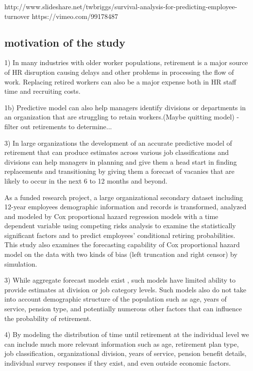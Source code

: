 \documentclass[12pt,letterpaper]{article}
\begin{document}
http://www.slideshare.net/twbriggs/survival-analysis-for-predicting-employee-turnover
https://vimeo.com/99178487


\subsection{motivation of the study}
1) In many industries with older worker populations, retirement is a major source of HR disruption causing delays and other problems in processing the flow of work.  Replacing retired workers can also be a major expense both in HR staff time and recruiting costs.

1b) Predictive model can also help managers identify divisions or departments in an organization that are struggling to retain workers.(Maybe quitting model) - filter out retirements to determine...

3) In large organizations the development of an accurate predictive model of retirement that can produce estimates across various job classifications and divisions can help managers in planning and give them a head start in finding replacements and transitioning by giving them a forecast of vacanies that are likely to occur in the next 6 to 12 months and beyond.



As a funded research project, a large organizational secondary dataset including 12-year employees demographic information and records is transformed, analyzed and modeled by Cox proportional hazard regression models with a time dependent variable using competing risks analysis to examine the statistically significant factors and to predict employees' conditional retiring probabilities. This study also examines the forecasting capability of Cox proportional hazard model on the data with two kinds of bias (left truncation and right censor) by simulation.

3) While aggregate forecast models exist \citep{zhu2015}, such models have limited ability to provide estimates at division or job category levels.  Such models also do not take into account demographic structure of the population such as age, years of service, pension type, and potentially numerous other factors that can influence the probability of retirement.

4) By modeling the distribution of time until retirement at the individual level we can include much more relevant information such as age, retirement plan type, job classification, organizational division, years of service, pension benefit details, individual survey responses if they exist, and even outside economic factors.  
\end{document}
